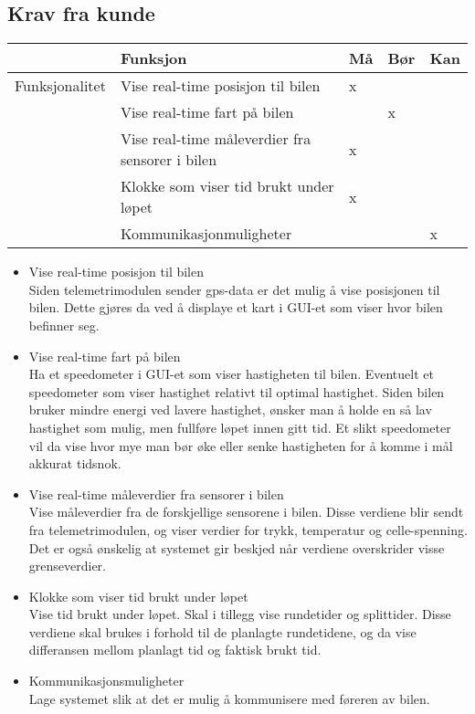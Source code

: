 \subsection{Krav fra kunde}
\begin{tabular}{|r|l|l|l|l|} 
\hline
 & \textbf{Funksjon} & \textbf{Må} & \textbf{Bør} & \textbf{Kan} \\ \hline
        Funksjonalitet  & Vise real-time posisjon til bilen & x &   & \\ \cline{2-5} 
                & Vise real-time fart på bilen &  & x  & \\ \cline{2-5} 
                & Vise real-time måleverdier fra sensorer i bilen & x &   & \\ \cline{2-5} 
                & Klokke som viser tid brukt under løpet   &  x &  & \\ \cline{2-5} 
                & Kommunikasjonmuligheter &  &   & x \\ \hline 
         \end{tabular}
\begin{itemize}
\item Vise real-time posisjon til bilen \\
Siden telemetrimodulen sender gps-data er det mulig  å vise posisjonen til bilen. Dette gjøres da ved å displaye et kart i GUI-et som viser hvor bilen befinner seg.
\item Vise real-time fart på bilen \\
Ha et speedometer i GUI-et som viser hastigheten til bilen. Eventuelt et speedometer som viser hastighet relativt til optimal hastighet. Siden bilen bruker mindre energi ved lavere hastighet, ønsker man å holde en så lav hastighet som mulig, men fullføre løpet innen gitt tid. Et slikt speedometer vil da vise hvor mye man bør øke eller senke hastigheten for å komme i mål akkurat tidsnok.
\item  Vise real-time måleverdier fra sensorer i bilen \\
Vise måleverdier fra de forskjellige sensorene i bilen. Disse verdiene blir sendt fra telemetrimodulen, og viser verdier for trykk, temperatur og celle-spenning. Det er også ønskelig at systemet gir beskjed når verdiene overskrider visse grenseverdier. 
\item Klokke som viser tid brukt under løpet \\
Vise tid brukt under løpet. Skal i tillegg vise rundetider og splittider. Disse verdiene skal brukes i forhold til de planlagte rundetidene, og da vise differansen mellom planlagt tid og faktisk brukt tid. 
\item Kommunikasjonsmuligheter \\
Lage systemet slik at det er mulig å kommunisere med føreren av bilen.
\end{itemize}
